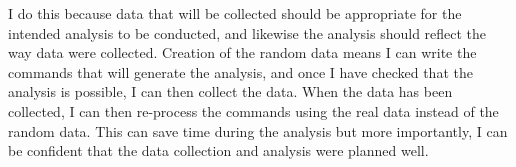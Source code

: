 I do this because data that will  be collected should be appropriate for the intended analysis to be conducted, and likewise the analysis should reflect the way data were collected. Creation of the random data means I can write the \R{} commands that will generate the analysis, and once I have checked that the analysis is possible, I can then collect the data. When the data has been collected, I can then re-process the commands using the real data instead of the  random data. This can save time during the analysis but more importantly, I can be confident that the data collection and analysis were planned well.



